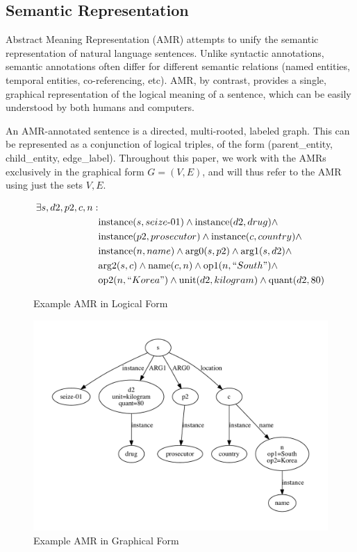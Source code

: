 \documentclass[12pt]{article}
\begin{document}
\subsection{Semantic Representation}

Abstract Meaning Representation (AMR)\cite{amr_sembank} attempts to unify the
semantic representation of natural language sentences. Unlike syntactic
annotations, semantic annotations often differ for different semantic relations
(named entities, temporal entities, co-referencing, etc). AMR, by contrast,
provides a single, graphical representation of the logical meaning of a
sentence, which can be easily understood by both humans and computers.

An AMR-annotated sentence is a directed, multi-rooted, labeled graph. This can be represented as a
conjunction of logical triples, of the form (parent\_entity, child\_entity, edge\_label). 
Throughout this paper, we work with the AMRs exclusively in the graphical form $G=(V,E)$, 
and will thus refer to the AMR using just the sets $V,E$.

\begin{figure}
\begin{equation*}
\begin{split}
\exists s,d2,p2,c,n: &\\
&\text{instance}(s,seize\text{-}01) \wedge \text{instance}(d2, drug) \wedge \\
&\text{instance}(p2, prosecutor) \wedge \text{instance}(c, country) \wedge \\
&\text{instance}(n, name) \wedge \text{arg0}(s,p2) \wedge \text{arg1}(s,d2)
\wedge \\ &\text{arg2}(s,c) \wedge \text{name}(c,n) \wedge \text{op1}(n,
``South") \wedge \\ &\text{op2}(n, ``Korea") \wedge \text{unit}(d2, kilogram)
\wedge \text{quant}(d2, 80)
\end{split}
\end{equation*}
\caption{Example AMR in Logical Form}
\label{fig:amr_example_logical}
\end{figure}

\begin{figure}
\includegraphics[width=\linewidth]{amr_example.pdf}
\caption{Example AMR in Graphical Form}
\label{fig:amr_example}
\end{figure}
\end{document}
